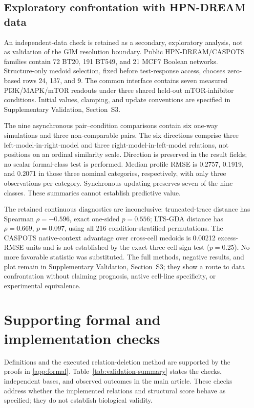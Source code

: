 \documentclass{ws-jbcb}
\numberwithin{equation}{section}
\begin{document}
\subsection{Exploratory confrontation with HPN-DREAM data}\label{sec:hpn-method}

An independent-data check is retained as a secondary, exploratory analysis,
not as validation of the GIM resolution boundary. Public HPN-DREAM/CASPOTS
families contain 72 BT20, 191 BT549, and 21 MCF7 Boolean networks.
Structure-only medoid selection, fixed before test-response access, chooses
zero-based rows 24, 137, and 9.\cite{Hill2016,Razzaq2018} The common interface
contains seven measured PI3K/MAPK/mTOR readouts under three shared held-out
mTOR-inhibitor conditions. Initial values, clamping, and update conventions
are specified in Supplementary Validation, Section~S3.

The nine asynchronous pair--condition comparisons contain six one-way
simulations and three non-comparable pairs. The six directions comprise three
left-model-in-right-model and three right-model-in-left-model relations, not
positions on an ordinal similarity scale. Direction is preserved in the result
fields; no scalar formal-class test is performed. Median profile RMSE is
0.2757, 0.1919, and 0.2071 in those three nominal categories, respectively,
with only three observations per category. Synchronous updating preserves
seven of the nine classes. These summaries cannot establish predictive value.

The retained continuous diagnostics are inconclusive: truncated-trace distance
has Spearman $\rho=-0.596$, exact one-sided $p=0.556$; LTS-GDA distance has
$\rho=0.669$, $p=0.097$, using all 216 condition-stratified permutations.
The CASPOTS native-context advantage over cross-cell medoids is 0.00212
excess-RMSE units and is not established by the exact three-cell sign test
($p=0.25$). No more favorable statistic was substituted. The full methods,
negative results, and plot remain in Supplementary Validation, Section~S3;
they show a route to data confrontation without claiming prognosis, native
cell-line specificity, or experimental equivalence.

\section{Supporting formal and implementation checks}
\label{sec:computational-validation}

Definitions and the executed relation-deletion method are supported by the
proofs in \ref{app:formal}. Table~\ref{tab:validation-summary} states
the checks, independent bases, and observed outcomes in the main article.
These checks address whether the implemented relations and structural score
behave as specified; they do not establish biological validity.
\end{document}
